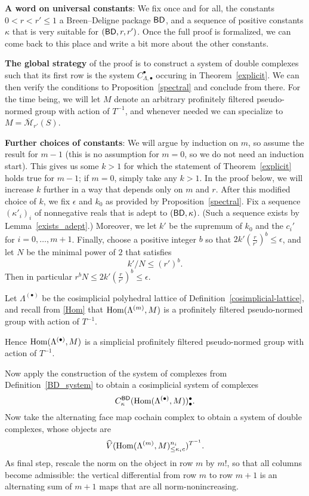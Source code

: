 \textbf{A word on universal constants}:
We fix once and for all, the constants $0 < r < r' \le 1$
a Breen--Deligne package $\mathsf{BD}$,
and a sequence of positive constants $\kappa$ that is very suitable for $(\mathsf{BD}, r, r')$.
Once the full proof is formalized,
we can come back to this place and write a bit more about the other constants.

\textbf{The global strategy}
of the proof is to construct a system of double complexes
such that its first row is the system $C_{\Lambda, \bullet}^\bullet$
occuring in Theorem~\ref{explicit}.
We can then verify the conditions to Proposition~\ref{spectral}
and conclude from there.
For the time being, we will let $M$ denote
an arbitrary profinitely filtered pseudo-normed group with action of $T^{-1}$,
and whenever needed we can specialize to $M = \overline{\mathcal M}_{r'}(S)$.

\textbf{Further choices of constants}:
We will argue by induction on $m$, so assume the result for $m-1$
(this is no assumption for $m=0$, so we do not need an induction start).
This gives us some $k>1$ for which the statement of Theorem~\ref{explicit} holds true for $m-1$;
if $m=0$, simply take any $k>1$.
In the proof below, we will increase $k$ further in a way that depends only on $m$ and $r$.
After this modified choice of $k$, we fix $\epsilon$ and $k_0$ as provided by Proposition~\ref{spectral}.
Fix a sequence $(\kappa'_i)_i$ of nonnegative reals that is adept to $(\mathsf{BD}, \kappa)$.
(Such a sequence exists by Lemma~\ref{exists_adept}.)
Moreover, we let $k'$ be the supremum of $k_0$ and the $c_i'$ for $i=0,\ldots,m+1$.
Finally, choose a positive integer $b$ so that $2k'(\tfrac r{r'})^b\leq \epsilon$,
and let $N$ be the minimal power of $2$ that satisfies
\[
  k'/N\leq (r')^b.
\]
Then in particular $r^bN\leq 2k'(\tfrac{r}{r'})^b\leq \epsilon$.

\begin{definition}
  \label{double_complex}
  \leanok
  Let $\Lambda^{(\bullet)}$ be the cosimplicial polyhedral lattice of
  Definition~\ref{cosimplicial-lattice},
  and recall from \ref{Hom} that $\operatorname{Hom}(\Lambda^{(m)}, M)$ is a
  profinitely filtered pseudo-normed group with action of $T^{-1}$.

  Hence $\operatorname{Hom}(\Lambda^{(\bullet)}, M)$ is a simplicial
  profinitely filtered pseudo-normed group with action of $T^{-1}$.

  Now apply the construction of the system of complexes from
  Definition~\ref{BD_system} to obtain a cosimplicial system of complexes
  \[
    C^{\mathsf{BD}}_{\kappa}(\operatorname{Hom}(\Lambda^{(\bullet)}, M))_\bullet^\bullet.
  \]
  Now take the alternating face map cochain complex
  to obtain a system of double complexes, whose objects are
  \[
    \widehat{V}(\operatorname{Hom}(\Lambda^{(m)},M)_{\leq \kappa_ic}^{n_i})^{T^{-1}}.
  \]
  As final step, rescale the norm on the object in row $m$ by $m!$,
  so that all columns become admissible:
  the vertical differential from row $m$ to row $m+1$
  is an alternating sum of $m+1$ maps that are all norm-nonincreasing.
\end{definition}

